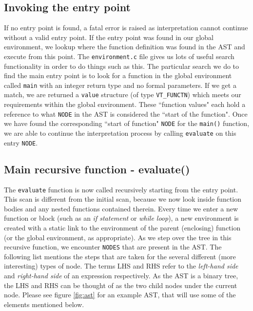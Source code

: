 \subsection{Invoking the entry point}
If no entry point is found, a fatal error is raised as interpretation cannot continue without a valid entry point. If the entry point was found in our global environment, we lookup where the function definition was found in the AST and execute from this point. The \verb!environment.c! file gives us lots of useful search functionality in order to do things such as this. The particular search we do to find the main entry point is to look for a function in the global environment called \verb!main! with an integer return type and no formal parameters. If we get a match, we are returned a \verb!value! structure (of type \verb!VT_FUNCTN!) which meets our requirements within the global environment. These ``function values" each hold a reference to what \verb!NODE! in the AST is considered the ``start of the function". Once we have found the corresponding ``start of function" \verb!NODE! for the \verb!main()! function, we are able to continue the interpretation process by calling \verb!evaluate! on this entry \verb!NODE!.

\subsection{Main recursive function - evaluate()}
The \verb!evaluate! function is now called recursively starting from the entry point. This scan is different from the initial scan, because we now look inside function bodies and any nested functions contained therein. Every time we enter a new function or block (such as an \emph{if statement} or \emph{while loop}), a new environment is created with a static link to the environment of the parent (enclosing) function (or the global environment, as appropriate). As we step over the tree in this recursive function, we encounter \verb!NODES! that are present in the AST. The following list mentions the steps that are taken for the several different (more interesting) types of node. The terms LHS and RHS refer to the \emph{left-hand side} and \emph{right-hand side} of an expression respectively. As the AST is a binary tree, the LHS and RHS can be thought of as the two child nodes under the current node. Please see figure \ref{fig:ast} for an example AST, that will use some of the elements mentioned below.

